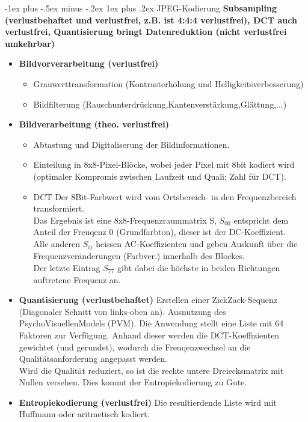 \documentclass[10pt,landscape]{article}
\makeatletter
\renewcommand{\subsubsection}{\@startsection{subsubsection}{3}{0mm}%
                                {-1ex plus -.5ex minus -.2ex}%
                                {1ex plus .2ex}%
                                {\normalfont\small\bfseries}}
\makeatother
\begin{document}
\begin{multicols}{3}
\subsubsection{JPEG-Kodierung}
\textbf{Subsampling (verlustbehaftet und verlustfrei, z.B. ist 4:4:4 verlustfrei), DCT auch verlustfrei, Quantisierung bringt Datenreduktion (nicht verlustfrei umkehrbar)}
\begin{itemize}
    \item \textbf{Bildvorverarbeitung (verlustfrei)}
        \begin{itemize}
            \item Grauwerttransformation (Kontrasterh\"ohung und Helligkeitsverbesserung)
            \item Bildfilterung (Rauschunterdr\"uckung,Kantenverst\"arkung,Gl\"attung,...)
        \end{itemize}
    \item \textbf{Bildverarbeitung (theo. verlustfrei)}
    \begin{itemize}
        \item Abtastung und Digitaliserung der Bildinformationen.
        \item Einteilung in 8x8-Pixel-Bl\"ocke, wobei jeder Pixel mit 8bit kodiert wird (optimaler Kompromis zwischen Laufzeit und Quali; Zahl f\"ur DCT).
        \item DCT Der 8Bit-Farbwert wird vom Ortsbereich- in den Frequenzbereich transformiert. \\
            Das Ergebnis ist eine 8x8-Frequenzraummatrix S, $S_{00}$ entspricht dem Anteil der Freuqenz 0 (Grundfarbton), dieser ist der DC-Koeffizient.\\
            Alle anderen $S_{ij}$ heissen AC-Koeffizienten und geben Auskunft \"uber die Frequenzver\"anderungen (Farbver.) innerhalb des Blockes.\\
            Der letzte Eintrag $S_{77}$ gibt dabei die h\"ochste in beiden Richtungen auftretene Frequenz an.
    \end{itemize}
    \item \textbf{Quantisierung (verlustbehaftet)} Erstellen einer ZickZack-Sequenz (Diagonaler Schnitt von links-oben an). Ausnutzung des PsychoVisuellenModels (PVM).
        Die Anwendung stellt eine Liste mit 64 Faktoren zur Verf\"ugung. Anhand dieser werden die DCT-Koeffizienten gewichtet (und gerundet),
        wodurch die Freuqenzwechsel an die Qualit\"atsanforderung angepasst werden.\\
        Wird die Qualit\"at reduziert, so ist die rechte untere Dreiecksmatrix mit Nullen versehen. Dies kommt der Entropiekodierung zu Gute.
    \item \textbf{Entropiekodierung (verlustfrei)} Die resultierdende Liste wird mit Huffmann oder aritmetisch kodiert.    
\end{itemize}

\end{multicols}
\end{document}
